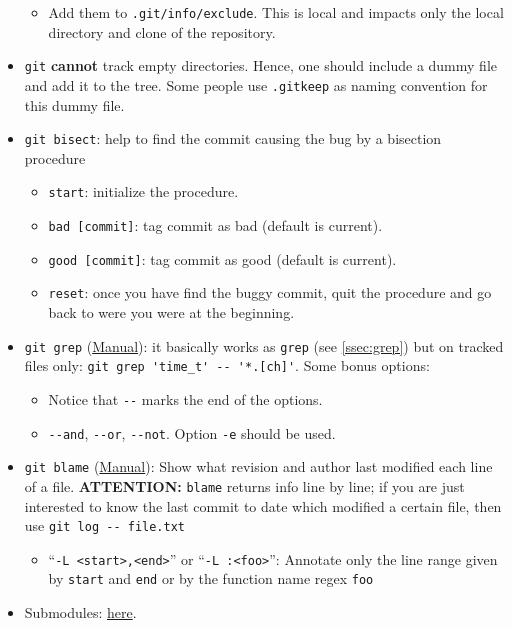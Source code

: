 \documentclass[a4paper,12pt,%
              final%
              ]{article}
\begin{document}
\begin{itemize}
\begin{itemize}
      \item Add them to \texttt{.git/info/exclude}. This is local and impacts only the local directory and clone of the repository.
    \end{itemize}
  \item \texttt{git} \textbf{cannot} track empty directories. Hence, one should include a dummy file and add it to the tree. Some people use \verb|.gitkeep| as naming convention for this dummy file.
  \item \texttt{git bisect}: help to find the commit causing the bug by a bisection procedure
    \begin{itemize}
      \item \verb|start|: initialize the procedure.
      \item \verb|bad [commit]|: tag commit as bad (default is current).
      \item \verb|good [commit]|: tag commit as good (default is current).
      \item \verb|reset|: once you have find the buggy commit, quit the procedure and go back to were you were at the beginning.
    \end{itemize}
  \item \verb|git grep| (\href{https://git-scm.com/docs/git-grep}{Manual}): it basically works as \verb|grep| (see \autoref{ssec:grep}) but on tracked files only: \verb|git grep 'time_t' -- '*.[ch]'|. Some bonus options:
    \begin{itemize}
      \item Notice that \verb|--| marks the end of the options.
      \item \verb|--and|, \verb|--or|, \verb|--not|. Option \verb|-e| should be used.
    \end{itemize}
  \item \verb|git blame| (\href{https://git-scm.com/docs/git-blame}{Manual}): Show what revision and author last modified each line of a file. \textbf{ATTENTION:} \texttt{blame} returns info line by line; if you are just interested to know the last commit to date which modified a certain file, then use \verb|git log -- file.txt|
    \begin{itemize}
      \item ``\verb|-L <start>,<end>|'' or ``\verb|-L :<foo>|'': Annotate only the line range given by \verb|start| and \verb|end| or by the function name regex \verb|foo|
    \end{itemize}
  \item Submodules: \href{https://git-scm.com/book/en/v2/Git-Tools-Submodules}{here}.

\end{itemize}
\end{document}

